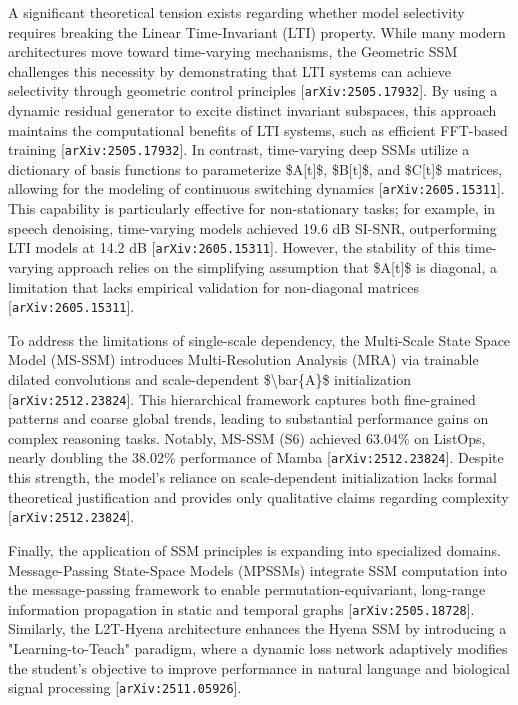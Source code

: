 \documentclass[11pt]{article}
\begin{document}
A significant theoretical tension exists regarding whether model selectivity requires breaking the Linear Time-Invariant (LTI) property. While many modern architectures move toward time-varying mechanisms, the Geometric SSM challenges this necessity by demonstrating that LTI systems can achieve selectivity through geometric control principles [\texttt{arXiv:2505.17932}]. By using a dynamic residual generator to excite distinct invariant subspaces, this approach maintains the computational benefits of LTI systems, such as efficient FFT-based training [\texttt{arXiv:2505.17932}]. In contrast, time-varying deep SSMs utilize a dictionary of basis functions to parameterize \$A[t]\$, \$B[t]\$, and \$C[t]\$ matrices, allowing for the modeling of continuous switching dynamics [\texttt{arXiv:2605.15311}]. This capability is particularly effective for non-stationary tasks; for example, in speech denoising, time-varying models achieved 19.6 dB SI-SNR, outperforming LTI models at 14.2 dB [\texttt{arXiv:2605.15311}]. However, the stability of this time-varying approach relies on the simplifying assumption that \$A[t]\$ is diagonal, a limitation that lacks empirical validation for non-diagonal matrices [\texttt{arXiv:2605.15311}].

To address the limitations of single-scale dependency, the Multi-Scale State Space Model (MS-SSM) introduces Multi-Resolution Analysis (MRA) via trainable dilated convolutions and scale-dependent \$\textbackslash{}bar\{A\}\$ initialization [\texttt{arXiv:2512.23824}]. This hierarchical framework captures both fine-grained patterns and coarse global trends, leading to substantial performance gains on complex reasoning tasks. Notably, MS-SSM (S6) achieved 63.04\% on ListOps, nearly doubling the 38.02\% performance of Mamba [\texttt{arXiv:2512.23824}]. Despite this strength, the model's reliance on scale-dependent initialization lacks formal theoretical justification and provides only qualitative claims regarding complexity [\texttt{arXiv:2512.23824}].

Finally, the application of SSM principles is expanding into specialized domains. Message-Passing State-Space Models (MPSSMs) integrate SSM computation into the message-passing framework to enable permutation-equivariant, long-range information propagation in static and temporal graphs [\texttt{arXiv:2505.18728}]. Similarly, the L2T-Hyena architecture enhances the Hyena SSM by introducing a "Learning-to-Teach" paradigm, where a dynamic loss network adaptively modifies the student's objective to improve performance in natural language and biological signal processing [\texttt{arXiv:2511.05926}].
\end{document}
